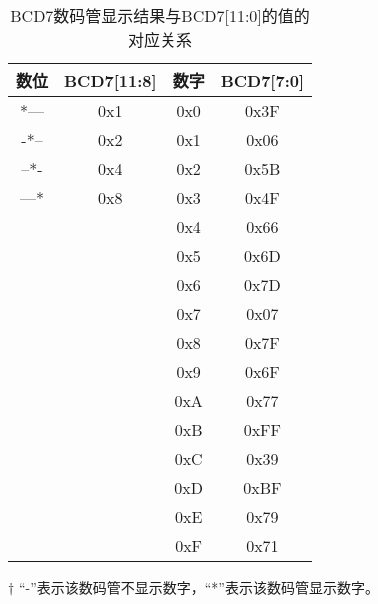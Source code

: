 \begin{table}[H]
    \centering
    \begin{threeparttable}
    \begin{tabular}{cc|cc}
        \toprule
        数位\tnote{$\dagger$} & BCD7[11:8] & 数字 & BCD7[7:0] \\
        \midrule
        *--- & 0x1 & 0x0 & 0x3F \\
        -*-- & 0x2 & 0x1 & 0x06 \\
        --*- & 0x4 & 0x2 & 0x5B \\
        ---* & 0x8 & 0x3 & 0x4F \\
             &     & 0x4 & 0x66 \\
             &     & 0x5 & 0x6D \\
             &     & 0x6 & 0x7D \\
             &     & 0x7 & 0x07 \\
             &     & 0x8 & 0x7F \\
             &     & 0x9 & 0x6F \\
             &     & 0xA & 0x77 \\
             &     & 0xB & 0xFF \\
             &     & 0xC & 0x39 \\
             &     & 0xD & 0xBF \\
             &     & 0xE & 0x79 \\
             &     & 0xF & 0x71 \\
        \bottomrule
    \end{tabular}
    \begin{tablenotes}
        \footnotesize
        \item[$\dagger$] ``-''表示该数码管不显示数字，``*''表示该数码管显示数字。
    \end{tablenotes}
    \end{threeparttable}
    \caption{BCD7数码管显示结果与BCD7[11:0]的值的对应关系}
    \label{tab:BCD7-display}
\end{table}
